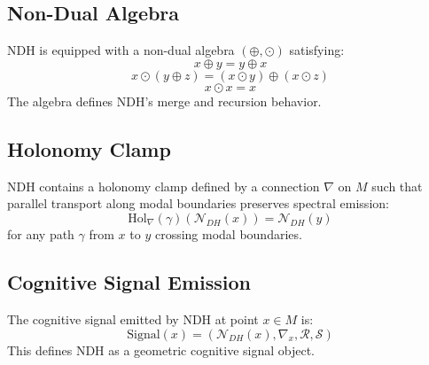 \subsection{Non-Dual Algebra}

NDH is equipped with a non-dual algebra $(\oplus, \odot)$ satisfying:
\[
x \oplus y = y \oplus x
\]
\[
x \odot (y \oplus z) = (x \odot y) \oplus (x \odot z)
\]
\[
x \odot x = x
\]
The algebra defines NDH's merge and recursion behavior.

\subsection{Holonomy Clamp}

NDH contains a holonomy clamp defined by a connection $\nabla$ on $M$ such that
parallel transport along modal boundaries preserves spectral emission:
\[
\text{Hol}_\nabla(\gamma)(\mathcal{N}_{DH}(x)) = \mathcal{N}_{DH}(y)
\]
for any path $\gamma$ from $x$ to $y$ crossing modal boundaries.

\subsection{Cognitive Signal Emission}

The cognitive signal emitted by NDH at point $x \in M$ is:
\[
\text{Signal}(x) = (\mathcal{N}_{DH}(x), \nabla_x, \mathcal{R}, \mathcal{S})
\]
This defines NDH as a geometric cognitive signal object.
